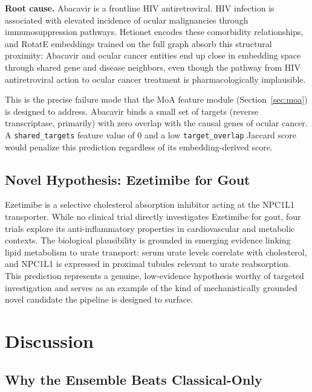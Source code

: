 \documentclass[twocolumn,10pt]{article}
\begin{document}
\textbf{Root cause.} Abacavir is a frontline HIV antiretroviral. HIV infection is associated with elevated incidence of ocular malignancies through immunosuppression pathways. Hetionet encodes these comorbidity relationships, and RotatE embeddings trained on the full graph absorb this structural proximity: Abacavir and ocular cancer entities end up close in embedding space through shared gene and disease neighbors, even though the pathway from HIV antiretroviral action to ocular cancer treatment is pharmacologically implausible.

This is the precise failure mode that the MoA feature module (Section~\ref{sec:moa}) is designed to address. Abacavir binds a small set of targets (reverse transcriptase, primarily) with zero overlap with the causal genes of ocular cancer. A \texttt{shared\_targets} feature value of 0 and a low \texttt{target\_overlap} Jaccard score would penalize this prediction regardless of its embedding-derived score.

\subsection{Novel Hypothesis: Ezetimibe for Gout}

Ezetimibe is a selective cholesterol absorption inhibitor acting at the NPC1L1 transporter. While no clinical trial directly investigates Ezetimibe for gout, four trials explore its anti-inflammatory properties in cardiovascular and metabolic contexts. The biological plausibility is grounded in emerging evidence linking lipid metabolism to urate transport: serum urate levels correlate with cholesterol, and NPC1L1 is expressed in proximal tubules relevant to urate reabsorption. This prediction represents a genuine, low-evidence hypothesis worthy of targeted investigation and serves as an example of the kind of mechanistically grounded novel candidate the pipeline is designed to surface.

\section{Discussion}

\subsection{Why the Ensemble Beats Classical-Only}
\end{document}
